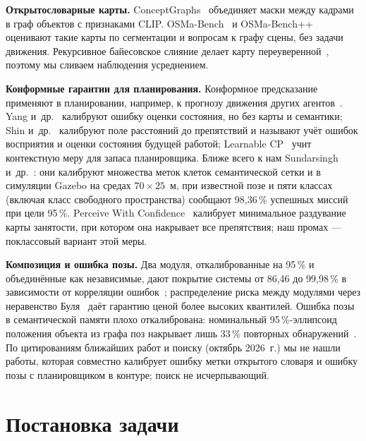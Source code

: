 \documentclass[conference,a4paper]{IEEEtran}
\theoremstyle{definition}
\begin{document}
\textbf{Открытословарные карты.} ConceptGraphs~\cite{conceptgraphs} объединяет маски между кадрами в граф объектов с
признаками CLIP. OSMa-Bench~\cite{osmabench} и OSMa-Bench++~\cite{osmabenchpp} оценивают такие карты по сегментации и
вопросам к графу сцены, без задачи движения. Рекурсивное байесовское слияние делает карту
переуверенной~\cite{overconf}, поэтому мы сливаем наблюдения усреднением.

\textbf{Конформные гарантии для планирования.} Конформное предсказание применяют в планировании, например, к прогнозу
движения других агентов~\cite{lindemann}. Yang и~др.~\cite{yang2023} калибруют ошибку оценки состояния, но без карты и
семантики; Shin и~др.~\cite{shin2026} калибруют поле расстояний до препятствий и называют учёт ошибок восприятия и
оценки состояния будущей работой; Learnable CP~\cite{learnablecp} учит контекстную меру для запаса планировщика. Ближе
всего к нам Sundarsingh и~др.~\cite{sundarsingh}: они калибруют множества меток клеток семантической сетки и в
симуляции Gazebo на средах $70\times25$~м, при известной позе и пяти классах (включая класс свободного пространства) сообщают 98,36\,\%
успешных миссий при цели 95\,\%. Perceive With Confidence~\cite{pwc} калибрует минимальное раздувание карты занятости,
при котором она накрывает все препятствия; наш промах --- поклассовый вариант этой меры.

\textbf{Композиция и ошибка позы.} Два модуля, откалиброванные на 95\,\% и объединённые как независимые, дают покрытие
системы от 86,46 до 99,98\,\% в зависимости от корреляции ошибок~\cite{baral}; распределение риска между модулями через
неравенство Буля~\cite{calafiore2026} даёт гарантию ценой более высоких квантилей. Ошибка позы в семантической памяти
плохо откалибрована: номинальный 95\,\%-эллипсоид положения объекта из графа поз накрывает лишь 33\,\% повторных
обнаружений~\cite{pposemem}. По цитированиям ближайших работ и поиску (октябрь 2026~г.) мы не нашли работы, которая
совместно калибрует ошибку метки открытого словаря и ошибку позы с планировщиком в контуре; поиск не исчерпывающий.

\section{Постановка задачи}\label{sec:problem}
\end{document}
